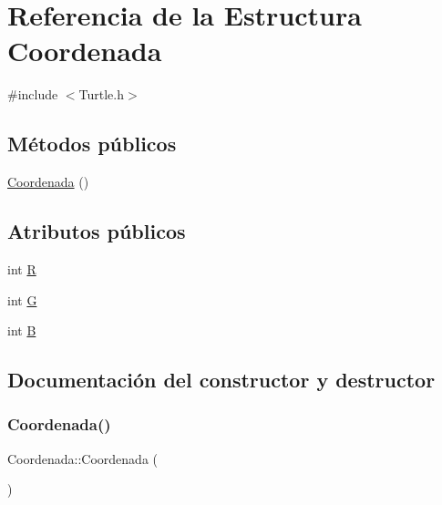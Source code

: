 \hypertarget{struct_coordenada}{}\section{Referencia de la Estructura Coordenada}
\label{struct_coordenada}


{\ttfamily \#include $<$Turtle.\+h$>$}

\subsection*{Métodos públicos}
\begin{DoxyCompactItemize}
\item 
\mbox{\hyperlink{struct_coordenada_ab3e7cadd37abe7b2522f0e55a31479db}{Coordenada}} ()
\end{DoxyCompactItemize}
\subsection*{Atributos públicos}
\begin{DoxyCompactItemize}
\item 
int \mbox{\hyperlink{struct_coordenada_a9b9f46aaf2177a9ea2c295f8e2c86973}{R}}
\item 
int \mbox{\hyperlink{struct_coordenada_ae75df3b2848c88c3a4a0de5547a3f1b6}{G}}
\item 
int \mbox{\hyperlink{struct_coordenada_a621f1a40b6c15b276f3c0c7beb2ef2d5}{B}}
\end{DoxyCompactItemize}


\subsection{Documentación del constructor y destructor}
\mbox{\label{struct_coordenada_ab3e7cadd37abe7b2522f0e55a31479db}} 
\subsubsection{\texorpdfstring{Coordenada()}{Coordenada()}}
{\footnotesize\ttfamily Coordenada\+::\+Coordenada (\begin{DoxyParamCaption}{ }\end{DoxyParamCaption})\hspace{0.3cm}{\ttfamily [inline]}}



